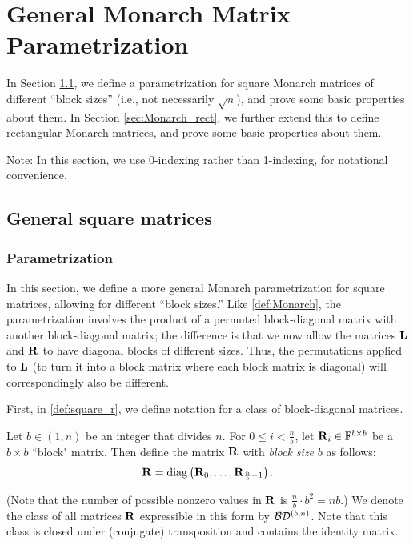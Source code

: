
\newcommand{\baseb}[3]{\parens{{#1},{#2}}_{{#3}}}
\newcommand{\mx}[1]{\mathbf{#1}}
\newcommand{\floors}[1]{\left \lfloor #1 \right \rfloor}
\newcommand{\parens}[1]{\left( {#1}\right)}

\section{General Monarch Matrix Parametrization}
\label{sec:permutation}

In Section \ref{sec:Monarch_square}, we define a parametrization for square Monarch matrices of different ``block sizes'' (i.e., not necessarily $\sqrt{n}$), and prove some basic properties about them. In Section \ref{sec:Monarch_rect}, we further extend this to define rectangular Monarch matrices, and prove some basic properties about them.

Note: In this section, we use 0-indexing rather than 1-indexing, for notational convenience.

\subsection{General square matrices}
\label{sec:Monarch_square}
\subsubsection{Parametrization}
\label{sec:Monarch_square_param}
In this section, we define a more general Monarch parametrization for square matrices, allowing for different ``block sizes.'' Like \cref{def:Monarch}, the parametrization involves the product of a permuted block-diagonal matrix with another block-diagonal matrix; the difference is that we now allow the matrices $\mathbf{L}$ and $\mathbf{R}$ to have diagonal blocks of different sizes. Thus, the permutations applied to $\mathbf{L}$ (to turn it into a block matrix where each block matrix is diagonal) will correspondingly also be different.

First, in \cref{def:square_r}, we define notation for a class of block-diagonal matrices.

\begin{definition}
\label{def:square_r}
Let $b \in (1, n)$ be an integer that divides $n$. For $0\le i< \frac {n}{b}$, let $\mx{R}_{i}\in\F^{b \times b }$ be a $b \times b $ ``block" matrix. Then define the matrix $\mathbf{R}$ with {\em block size} $b$ as follows:
\begin{equation}
 \label{eq:def-R}
  \mathbf{R} = \mathrm{diag}\left(\mathbf{R}_0, \dots, \mathbf{R}_{\frac {n}{b}-1}\right).
\end{equation}
\end{definition}
(Note that the number of possible nonzero values in $\mathbf{R}$ is $\frac {n}{b}\cdot b^2=nb$.)
We denote the class of all matrices $\mathbf{R}$ expressible in this form by $\mathcal{B}\mathcal{D}^{(b, n)}$. Note that this class is closed under (conjugate) transposition and contains the identity matrix.

